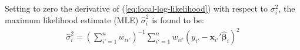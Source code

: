 \documentclass[authoryear, review, 11pt]{elsarticle}
\begin{document}
	 Setting to zero the derivative of (\ref{eq:local-log-likelihood}) with respect to $\sigma_i^2$, the maximum likelihood estimate (MLE) $\hat{\sigma}_i^2$ is found to be:	 
	 \begin{align}
	 	\hat{\sigma}_i^2 = \left(\sum \limits_{i'=1}^{n} w_{ii'} \right)^{-1} \sum \limits_{i'=1}^n w_{ii'}\left(y_{i'} - \bm{x}_{i'}'\hat{\bm{\beta}}_i\right)^2
	\end{align}
	

	
\end{document}
